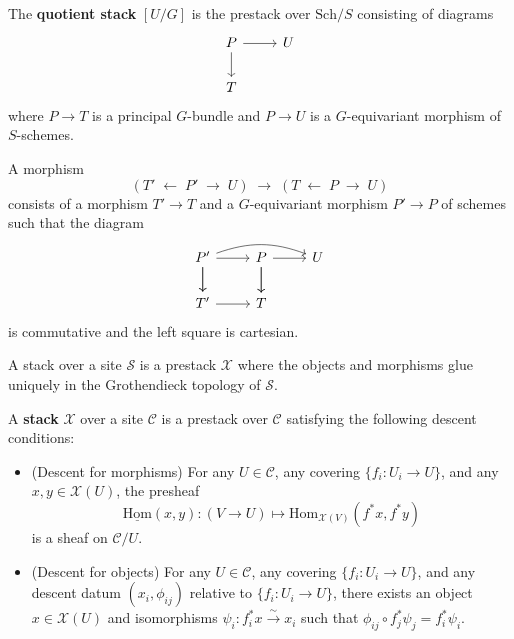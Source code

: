\documentclass[12pt]{article}
\begin{document}
\begin{definition}
  The \textbf{quotient stack} $[U/G]$ is the prestack over $\mathrm{Sch}/S$ consisting of diagrams
  \[
    \begin{tikzcd}
      P \arrow[r] \arrow[d] & U \\
      T
    \end{tikzcd}
  \]
  where $P \to T$ is a principal $G$-bundle and $P \to U$ is a $G$-equivariant morphism of $S$-schemes.

  A morphism
  \[
    (T' \;\longleftarrow\; P' \;\longrightarrow\; U) \;\longrightarrow\;
    (T \;\longleftarrow\; P \;\longrightarrow\; U)
  \]
  consists of a morphism $T' \to T$ and a $G$-equivariant morphism $P' \to P$ of schemes such that the diagram
  \[
    \begin{tikzcd}
      P' \arrow[r] \arrow[d] \arrow[rr, bend left=20] &
      P \arrow[r] \arrow[d] &
      U \\
      T' \arrow[r] & T &
      \arrow[from=1-1, to=2-1]
      \arrow[from=1-2, to=2-2]
    \end{tikzcd}
  \]
  is commutative and the left square is cartesian.
\end{definition}

A stack over a site $\mathcal{S}$ is a prestack $\mathcal{X}$ where the objects and morphisms glue uniquely in the Grothendieck topology of $\mathcal{S}$.

\begin{definition}
  [Stack] \label{def:stack}
  A \textbf{stack} $\mathcal{X}$ over a site $\mathcal{C}$ is a prestack over $\mathcal{C}$ satisfying the following descent conditions:
  \begin{itemize}
    \item (Descent for morphisms) For any $U\in\mathcal{C}$, any covering $\{f_i:U_i\to U\}$, and any $x,y\in\mathcal{X}(U)$, the presheaf
          \[
            \underline{\mathrm{Hom}}(x,y): (V\to U) \mapsto \mathrm{Hom}_{\mathcal{X}(V)}(f^*x,f^*y)
          \]
          is a sheaf on $\mathcal{C}/U$.
    \item (Descent for objects) For any $U\in\mathcal{C}$, any covering $\{f_i:U_i\to U\}$, and any descent datum $(x_i,\phi_{ij})$ relative to $\{f_i:U_i\to U\}$, there exists an object $x\in\mathcal{X}(U)$ and isomorphisms $\psi_i:f_i^*x\xrightarrow{\sim} x_i$ such that $\phi_{ij}\circ f_j^*\psi_j = f_i^*\psi_i$.
  \end{itemize}
\end{definition}
\end{document}
